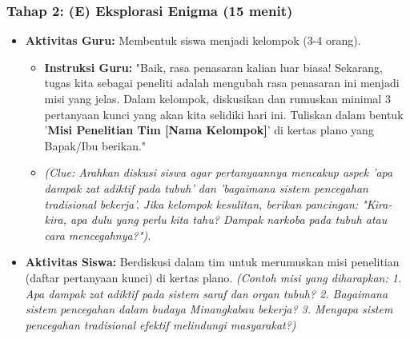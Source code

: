 \documentclass[a4paper,12pt]{article}
\begin{document}
\subsubsection{Tahap 2: (E) Eksplorasi Enigma (15 menit)}
\begin{itemize}
\item \textbf{Aktivitas Guru:} Membentuk siswa menjadi kelompok (3-4 orang).
    \begin{itemize}
    \item \textbf{Instruksi Guru:} "Baik, rasa penasaran kalian luar biasa! Sekarang, tugas kita sebagai peneliti adalah mengubah rasa penasaran ini menjadi misi yang jelas. Dalam kelompok, diskusikan dan rumuskan minimal 3 pertanyaan kunci yang akan kita selidiki hari ini. Tuliskan dalam bentuk '\textbf{Misi Penelitian Tim [Nama Kelompok]}' di kertas plano yang Bapak/Ibu berikan."
    \item \textit{(Clue: Arahkan diskusi siswa agar pertanyaannya mencakup aspek 'apa dampak zat adiktif pada tubuh' dan 'bagaimana sistem pencegahan tradisional bekerja'. Jika kelompok kesulitan, berikan pancingan: "Kira-kira, apa dulu yang perlu kita tahu? Dampak narkoba pada tubuh atau cara mencegahnya?").}
    \end{itemize}
\item \textbf{Aktivitas Siswa:} Berdiskusi dalam tim untuk merumuskan misi penelitian (daftar pertanyaan kunci) di kertas plano. \textit{(Contoh misi yang diharapkan: 1. Apa dampak zat adiktif pada sistem saraf dan organ tubuh? 2. Bagaimana sistem pencegahan dalam budaya Minangkabau bekerja? 3. Mengapa sistem pencegahan tradisional efektif melindungi masyarakat?)}
\end{itemize}
\end{document}

